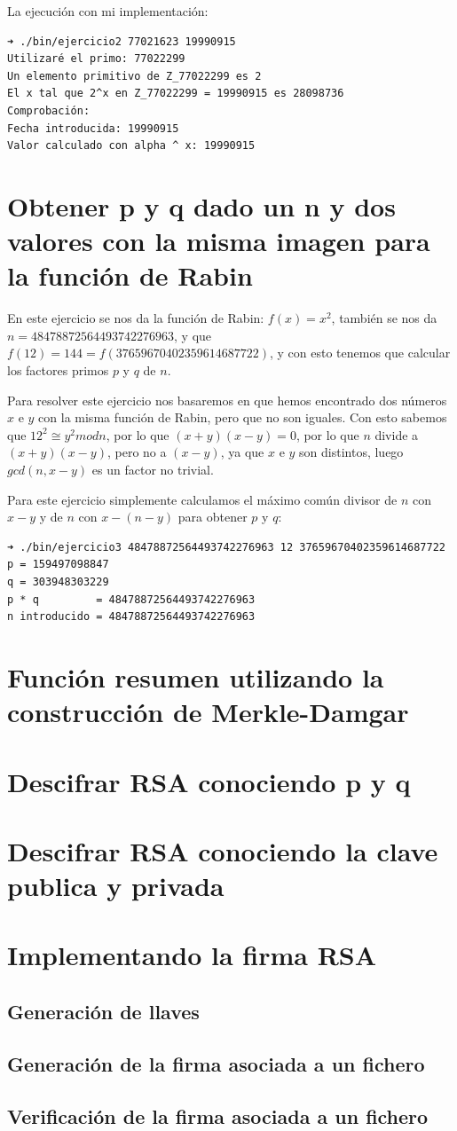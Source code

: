 \documentclass[12pt, spanish]{article}
\begin{document}
La ejecución con mi implementación:

\begin{lstlisting}
➜ ./bin/ejercicio2 77021623 19990915
Utilizaré el primo: 77022299
Un elemento primitivo de Z_77022299 es 2
El x tal que 2^x en Z_77022299 = 19990915 es 28098736
Comprobación:
Fecha introducida: 19990915
Valor calculado con alpha ^ x: 19990915
\end{lstlisting}


\section{Obtener p y q dado un n y dos valores con la misma imagen para la función de Rabin}

En este ejercicio se nos da la función de Rabin: $f(x) = x^2$, también se nos da $n = 48478872564493742276963$, y que $f (12) =144 = f (37659670402359614687722)$, y con esto tenemos que calcular los factores primos $p$ y $q$ de $n$.

Para resolver este ejercicio nos basaremos en que hemos encontrado dos números $x$ e $y$ con la misma función de Rabin, pero que no son iguales. Con esto sabemos que $12^2 \cong y^2 mod n$, por lo que $(x + y)(x - y) = 0$, por lo que $n$ divide a $(x + y)(x - y)$, pero no a $(x - y)$, ya que $x$ e $y$ son distintos, luego $gcd(n, x - y)$ es un factor no trivial.

Para este ejercicio simplemente calculamos el máximo común divisor de $n$ con $x - y$ y de $n$ con $x - (n - y)$ para obtener $p$ y $q$:

\begin{lstlisting}
➜ ./bin/ejercicio3 48478872564493742276963 12 37659670402359614687722
p = 159497098847
q = 303948303229
p * q         = 48478872564493742276963
n introducido = 48478872564493742276963
\end{lstlisting}


\section{Función resumen utilizando la construcción de Merkle-Damgar}

\section{Descifrar RSA conociendo p y q}

\section{Descifrar RSA conociendo la clave publica y privada}

\section{Implementando la firma RSA}

\subsection{Generación de llaves}

\subsection{Generación de la firma asociada a un fichero}

\subsection{Verificación de la firma asociada a un fichero}
\end{document}
